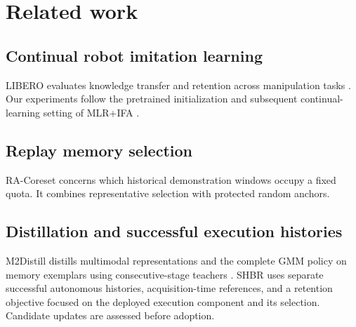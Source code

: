 \section{Related work}
\subsection{Continual robot imitation learning}
LIBERO evaluates knowledge transfer and retention across manipulation
tasks \citep{liu2023libero}. Our experiments follow the pretrained
initialization and subsequent continual-learning setting of MLR+IFA
\citep{yu2026mlr}.
\subsection{Replay memory selection}
RA-Coreset concerns which historical demonstration windows occupy a fixed
quota. It combines representative selection with protected random anchors.
\subsection{Distillation and successful execution histories}
M2Distill distills multimodal representations and the complete GMM policy
on memory exemplars using consecutive-stage teachers \citep{roy2025m2distill}.
SHBR uses separate successful autonomous histories, acquisition-time
references, and a retention objective focused on the deployed execution
component and its selection. Candidate updates are assessed before adoption.
